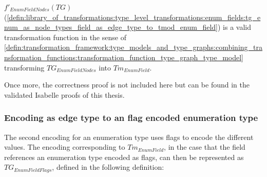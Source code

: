 \begin{thm}
\label{defin:library_of_transformations:type_level_transformations:enum_fields:tg_enum_as_node_types_field_as_edge_type_to_tmod_enum_field_func}
$f'_{EnumFieldNodes}(TG)$ (\cref{defin:library_of_transformations:type_level_transformations:enum_fields:tg_enum_as_node_types_field_as_edge_type_to_tmod_enum_field}) is a valid transformation function in the sense of \cref{defin:transformation_framework:type_models_and_type_graphs:combining_transformation_functions:transformation_function_type_graph_type_model} transforming $TG_{EnumFieldNodes}$ into $Tm_{EnumField}$.
\end{thm}

Once more, the correctness proof is not included here but can be found in the validated Isabelle proofs of this thesis.

\subsubsection{Encoding as edge type to an flag encoded enumeration type}

The second encoding for an enumeration type uses flags to encode the different values. The encoding corresponding to $Tm_{EnumField}$, in the case that the field references an enumeration type encoded as flags, can then be represented as $TG_{EnumFieldFlags}$, defined in the following definition:


